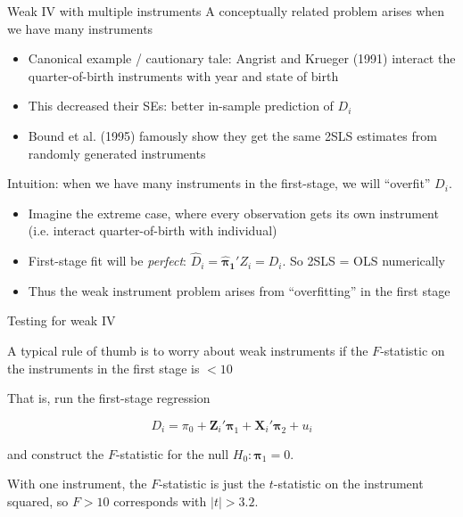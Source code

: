 \documentclass[11pt,english,handout]{beamer}
\newenvironment{wideitemize}{\itemize\addtolength{\itemsep}{10pt}}{\enditemize}
\begin{document}
\begin{frame}{Weak IV with multiple instruments}
	\vspace{0.2cm}
	A conceptually related problem arises when we have many instruments \pause{}
	
	\begin{itemize}
		\item Canonical example / cautionary tale: Angrist and Krueger (1991) interact the quarter-of-birth instruments with year and state of birth\pause{}
		\vspace{0.1cm}
		\item This decreased their SEs: better in-sample prediction of $D_i$\pause{}
		\vspace{0.1cm}
		\item Bound et al. (1995) famously show they get the same 2SLS estimates from randomly generated instruments
	\end{itemize}
	\pause{}
	\vspace{0.4cm}
	
	Intuition: when we have many instruments in the first-stage, we will ``overfit'' $D_i$. \pause{}
	
	
	\begin{itemize}
		\item  Imagine the extreme case, where every observation gets its own instrument (i.e. interact quarter-of-birth with individual)
		\item First-stage fit will be \emph{perfect}: $\hat{D}_i = \bm{\hat\pi_1}'Z_i =D_i$. So 2SLS = OLS numerically
		\item Thus the weak instrument problem arises from ``overfitting'' in the first stage
	\end{itemize}
	
\end{frame}


\begin{frame}{Testing for weak IV}
	\begin{wideitemize}
		\item
		A typical rule of thumb is to worry about weak instruments if the $F$-statistic on the instruments in the first stage is $<10$
		
		\item
		That is, run the first-stage regression
		
		$$D_i = \pi_0 + \bm{Z}_i ' \bm{\pi}_1 + \bm{X}_i' \bm{\pi}_2 + u_i$$
		
		\noindent and construct the $F$-statistic for the null $H_0: \bm{\pi}_1 = 0$. 
		
		\item
		With one instrument, the $F$-statistic is just the $t$-statistic on the instrument squared, so $F>10$ corresponds with $|t| > 3.2$.
		
		
	\end{wideitemize}
\end{frame}
\end{document}
